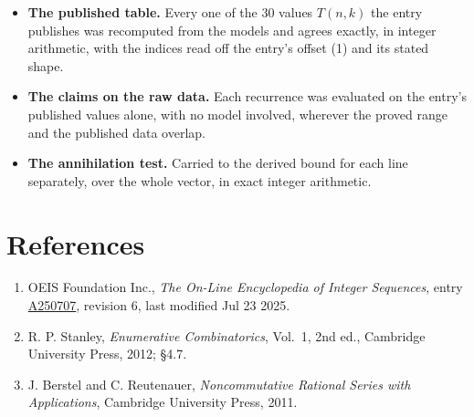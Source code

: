 \documentclass[11pt]{article}
\theoremstyle{definition}
\begin{document}
\begin{itemize}

\item {\bfseries The published table.} Every one of the 30 values $T(n,k)$ the entry publishes was recomputed from the models and agrees exactly, in integer arithmetic, with the indices read off the entry's offset (1) and its stated shape.

\item {\bfseries The claims on the raw data.} Each recurrence was evaluated on the entry's published values alone, with no model involved, wherever the proved range and the published data overlap.

\item {\bfseries The annihilation test.} Carried to the derived bound for each line separately, over the whole vector, in exact integer arithmetic.

\end{itemize}

\section{References}

\begin{enumerate}

\item OEIS Foundation Inc., \emph{The On-Line Encyclopedia of Integer Sequences}, entry \href{https://oeis.org/A250707}{A250707}, revision 6, last modified Jul 23 2025.

\item R. P. Stanley, \emph{Enumerative Combinatorics}, Vol.~1, 2nd ed., Cambridge University Press, 2012; \S4.7.

\item J. Berstel and C. Reutenauer, \emph{Noncommutative Rational Series with Applications}, Cambridge University Press, 2011.

\end{enumerate}
\end{document}
